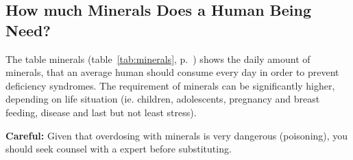 \documentclass[../main.tex]{subfiles}
\begin{document}
\subsection{How much Minerals Does a Human Being Need?}

    The table minerals (table~\ref{tab:minerals}, p.~\pageref{tab:minerals}) shows the daily amount of minerals,
    that an average human should consume every day in order to prevent deficiency syndromes.
    The requirement of minerals can be significantly higher, depending on life situation
    (ie. children, adolescents, pregnancy and breast feeding, disease and last but not least stress).

    \textbf{Careful:} Given that overdosing with minerals is very dangerous (poisoning),
    you should seek counsel with a expert before substituting.
\end{document}
